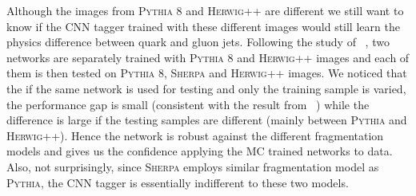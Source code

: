 
Although the images from \textsc{Pythia} 8 and \textsc{Herwig++} are different
we still want to know if the CNN tagger trained with these different images
would still learn the physics difference between quark and gluon jets. Following the study
of ~\cite{Barnard:2016qma}, two networks are separately trained with \textsc{Pythia} 8 and \textsc{Herwig++}
images and each of them is then tested on \textsc{Pythia} 8, \textsc{Sherpa} and \textsc{Herwig++}
images. We noticed that the if the same network is used for testing and only the training sample is varied, 
the performance gap is small (consistent with the result from ~\cite{Komiske:2016rsd}) while the difference is large
if the testing samples are different (mainly between \textsc{Pythia} and \textsc{Herwig++}).
Hence the network is robust against the different fragmentation models and gives
us the confidence applying the MC trained networks to data. Also, not surprisingly, since \textsc{Sherpa} employs similar fragmentation
model as \textsc{Pythia}, the CNN tagger is essentially indifferent to these two models.

